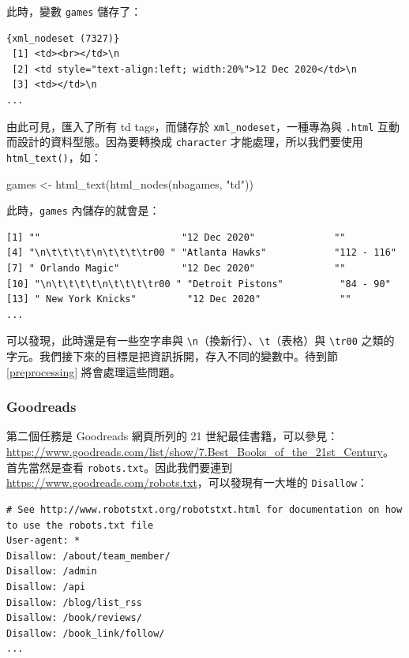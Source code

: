 \documentclass[
]{book}
\newenvironment{Shaded}{\begin{snugshade}}{\end{snugshade}}
\newcommand{\FunctionTok}[1]{\textcolor[rgb]{0.00,0.00,0.00}{#1}}
\newcommand{\NormalTok}[1]{#1}
\newcommand{\OtherTok}[1]{\textcolor[rgb]{0.56,0.35,0.01}{#1}}
\newcommand{\StringTok}[1]{\textcolor[rgb]{0.31,0.60,0.02}{#1}}
\theoremstyle{definition}
\theoremstyle{remark}
\begin{document}
此時，變數 \texttt{games} 儲存了：

\begin{verbatim}
{xml_nodeset (7327)}
 [1] <td><br></td>\n
 [2] <td style="text-align:left; width:20%">12 Dec 2020</td>\n
 [3] <td></td>\n
...
\end{verbatim}

由此可見，匯入了所有 td tags，而儲存於 \texttt{xml\_nodeset}，一種專為與 \texttt{.html} 互動而設計的資料型態。因為要轉換成 \texttt{character} 才能處理，所以我們要使用 \texttt{html\_text()}，如：

\begin{Shaded}
\begin{Highlighting}[]
\NormalTok{games }\OtherTok{\textless{}{-}} \FunctionTok{html\_text}\NormalTok{(}\FunctionTok{html\_nodes}\NormalTok{(nbagames, }\StringTok{"td"}\NormalTok{))}
\end{Highlighting}
\end{Shaded}

此時，\texttt{games} 內儲存的就會是：

\begin{verbatim}
[1] ""                         "12 Dec 2020"              ""                        
[4] "\n\t\t\t\t\n\t\t\t\tr00 " "Atlanta Hawks"            "112 - 116"               
[7] " Orlando Magic"           "12 Dec 2020"              ""                        
[10] "\n\t\t\t\t\n\t\t\t\tr00 " "Detroit Pistons"          "84 - 90"                 
[13] " New York Knicks"         "12 Dec 2020"              ""        
...
\end{verbatim}

可以發現，此時還是有一些空字串與 \texttt{\textbackslash{}n}（換新行）、\texttt{\textbackslash{}t}（表格）與 \texttt{\textbackslash{}tr00} 之類的字元。我們接下來的目標是把資訊拆開，存入不同的變數中。待到節 \ref{preprocessing} 將會處理這些問題。

\hypertarget{goodreads}{%
\subsubsection{Goodreads}\label{goodreads}}

第二個任務是 Goodreads 網頁所列的 21 世紀最佳書籍，可以參見：\url{https://www.goodreads.com/list/show/7.Best_Books_of_the_21st_Century}。首先當然是查看 \texttt{robots.txt}。因此我們要連到 \url{https://www.goodreads.com/robots.txt}，可以發現有一大堆的 \texttt{Disallow}：

\begin{verbatim}
# See http://www.robotstxt.org/robotstxt.html for documentation on how to use the robots.txt file
User-agent: *
Disallow: /about/team_member/
Disallow: /admin
Disallow: /api
Disallow: /blog/list_rss
Disallow: /book/reviews/
Disallow: /book_link/follow/
...
\end{verbatim}
\end{document}

